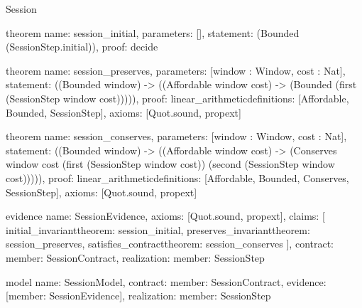 \begin{lexlean}{Session}
\begin{semanticmodule}
theorem{
  name: session_initial,
  parameters: [],
  statement: (Bounded (SessionStep.initial)),
  proof: decide{}
}

theorem{
  name: session_preserves,
  parameters: [window : Window, cost : Nat],
  statement: ((Bounded window) -> ((Affordable window cost) -> (Bounded (first (SessionStep window cost))))),
  proof: linear_arithmetic{definitions: [Affordable, Bounded, SessionStep]},
  axioms: [Quot.sound, propext]
}

theorem{
  name: session_conserves,
  parameters: [window : Window, cost : Nat],
  statement: ((Bounded window) -> ((Affordable window cost) -> (Conserves window cost (first (SessionStep window cost)) (second (SessionStep window cost))))),
  proof: linear_arithmetic{definitions: [Affordable, Bounded, Conserves, SessionStep]},
  axioms: [Quot.sound, propext]
}

evidence{
  name: SessionEvidence,
  axioms: [Quot.sound, propext],
  claims: [
    initial_invariant{theorem: session_initial},
    preserves_invariant{theorem: session_preserves},
    satisfies_contract{theorem: session_conserves}
  ],
  contract: {member: SessionContract},
  realization: {member: SessionStep}
}

model{
  name: SessionModel,
  contract: {member: SessionContract},
  evidence: [{member: SessionEvidence}],
  realization: {member: SessionStep}
}
\end{semanticmodule}
\end{lexlean}
